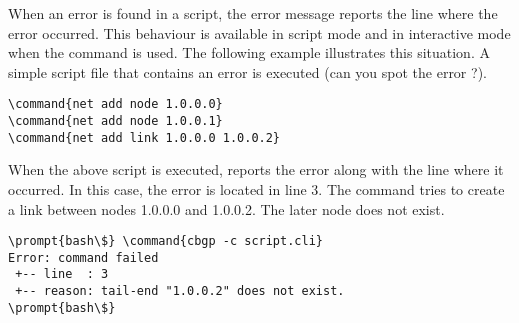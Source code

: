 When an error is found in a script, the error message reports the line
where the error occurred. This behaviour is available in script mode
and in interactive mode when the
\hyperref[cmd:include]{} command is used. The
following example illustrates this situation. A simple script file
that contains an error is executed (can you spot the error ?).

\begin{Verbatim}[commandchars=\\\{\}]
\command{net add node 1.0.0.0}
\command{net add node 1.0.0.1}
\command{net add link 1.0.0.0 1.0.0.2}
\end{Verbatim}

When the above script is executed,  reports the
error along with the line where it occurred. In this case, the error
is located in line 3. The command tries to create a link between nodes
1.0.0.0 and 1.0.0.2. The later node does not exist.

\begin{Verbatim}[commandchars=\\\{\}]
\prompt{bash\$} \command{cbgp -c script.cli}
Error: command failed
 +-- line  : 3
 +-- reason: tail-end "1.0.0.2" does not exist.
\prompt{bash\$}
\end{Verbatim}
